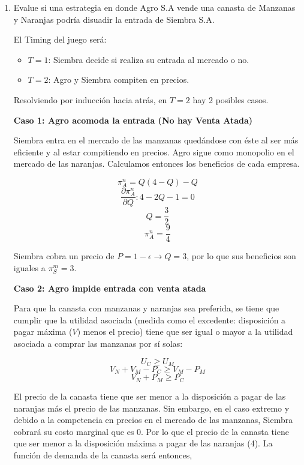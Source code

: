 \documentclass{exam}
\begin{document}
\begin{enumerate}
    \item Evalue si una estrategia en donde Agro S.A vende una canasta de Manzanas y Naranjas podría disuadir la entrada de Siembra S.A.
    \begin{solution}
        El Timing del juego será:
        \begin{itemize}
            \item $T = 1$: Siembra decide si realiza su entrada al mercado o no.
            \item $T = 2$: Agro y Siembra compiten en precios.
        \end{itemize}

        Resolviendo por inducción hacia atrás, en $T = 2$ hay 2 posibles casos.

        \textbf{Caso 1: Agro acomoda la entrada (No hay Venta Atada)}

        Siembra entra en el mercado de las manzanas quedándose con éste al ser más eficiente y al estar compitiendo en precios. Agro sigue como monopolio en el mercado de las naranjas. Calculamos entonces los beneficios de cada empresa.

        \[
        \pi_A^n = Q(4 - Q) - Q
        \]
        \[
        \frac{\partial \pi_A^n}{\partial Q} : 4 - 2Q - 1 = 0
        \]
        \[
        Q = \frac{3}{2}
        \]
        \[
        \pi_A^n = \frac{9}{4}
        \]

        Siembra cobra un precio de $P = 1 - \epsilon \rightarrow Q = 3$, por lo que sus beneficios son iguales a $\pi_S^m = 3$.

        \textbf{Caso 2: Agro impide entrada con venta atada}

        Para que la canasta con manzanas y naranjas sea preferida, se tiene que cumplir que la utilidad asociada (medida como el excedente: disposición a pagar máxima ($V$) menos el precio) tiene que ser igual o mayor a la utilidad asociada a comprar las manzanas por sí solas:
        
        \[
        U_C \geq U_M
        \]
        \[
        V_N + V_M - P_C \geq V_M - P_M
        \]
        \[
        V_N + P_M \geq P_C
        \]

        El precio de la canasta tiene que ser menor a la disposición a pagar de las naranjas más el precio de las manzanas. Sin embargo, en el caso extremo y debido a la competencia en precios en el mercado de las manzanas, Siembra cobrará su costo marginal que es 0. Por lo que el precio de la canasta tiene que ser menor a la disposición máxima a pagar de las naranjas (4). La función de demanda de la canasta será entonces,


\end{solution}
\end{enumerate}
\end{document}
